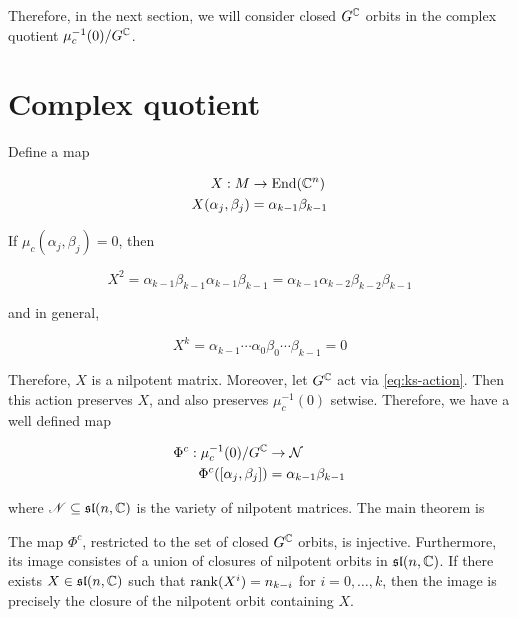 \documentclass{report}
\renewcommand{\sl}{\mathfrak{sl}}
\begin{document}
Therefore, in the next section, we will consider closed \(G^{\mathbb{C}}\) orbits in the complex quotient \(\mu_c^{-1}(0)/G^{\mathbb{C}}\).

\section{Complex quotient}

Define a map

\begin{align*}
    X : M &\to \operatorname{End}(\mathbb{C}^n) \\
    X(\alpha_j, \beta_j) &= \alpha_{k-1}\beta_{k-1}
\end{align*}

If \(\mu_c(\alpha_j, \beta_j) = 0\), then

\[X^2 = \alpha_{k-1}\beta_{k-1}\alpha_{k-1}\beta_{k-1} = \alpha_{k-1}\alpha_{k-2}\beta_{k-2}\beta_{k-1}\]

and in general,

\[X^k = \alpha_{k-1}\cdots \alpha_0\beta_0\cdots \beta_{k-1} = 0\]

Therefore, \(X\) is a nilpotent matrix. Moreover, let \(G^{\mathbb{C}}\) act via \cref{eq:ks-action}. Then this action preserves \(X\), and also preserves \(\mu_c^{-1}(0)\) setwise. Therefore, we have a well defined map

\begin{align*}
    \Phi^c : \mu_c^{-1}(0)/G^{\mathbb{C}} &\to \mathcal{N} \\
    \Phi^c([\alpha_j, \beta_j]) &= \alpha_{k-1}\beta_{k-1}
\end{align*}

where \(\msN \subseteq \sl(n, \C)\) is the variety of nilpotent matrices. The main theorem is

\begin{theorem}
    The map \(\Phi^c\), restricted to the set of closed \(G^{\mathbb{C}}\) orbits, is injective. Furthermore, its image consistes of a union of closures of nilpotent orbits in \(\sl(n, \C)\). If there exists \(X \in \sl(n, \C)\) such that \(\rank(X^i) = n_{k-i}\) for \(i = 0, \dots, k\), then the image is precisely the closure of the nilpotent orbit containing \(X\).
\end{theorem}
\end{document}
